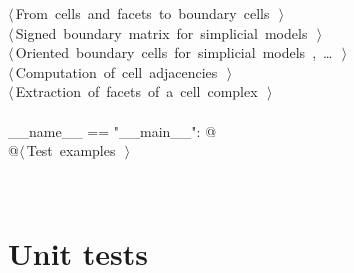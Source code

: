 \documentclass[11pt,oneside]{article}	%
\begin{document}
\begin{flushleft}
\begin{minipage}{\linewidth}
\begin{list}{}{}
\mbox{}\verb@@\hbox{$\langle\,$From cells and facets to boundary cells\nobreak\ {\footnotesize {}}$\,\rangle$}\verb@@\\
\mbox{}\verb@@\hbox{$\langle\,$Signed boundary matrix for simplicial models\nobreak\ {\footnotesize {}}$\,\rangle$}\verb@@\\
\mbox{}\verb@@\hbox{$\langle\,$Oriented boundary cells for simplicial models\nobreak\ {\footnotesize {}, \ldots\ }$\,\rangle$}\verb@@\\
\mbox{}\verb@@\hbox{$\langle\,$Computation of cell adjacencies\nobreak\ {\footnotesize {}}$\,\rangle$}\verb@@\\
\mbox{}\verb@@\hbox{$\langle\,$Extraction of facets of a cell complex\nobreak\ {\footnotesize {}}$\,\rangle$}\verb@@\\
\mbox{}\verb@@\\
\mbox{}\verb@if __name__ == "__main__": @\\
\mbox{}\verb@   @\hbox{$\langle\,$Test examples\nobreak\ {\footnotesize {}}$\,\rangle$}\verb@@\\
\mbox{}\verb@@{\NWsep}
\end{list}
\vspace{-2ex}
\end{minipage}\\[4ex]
\end{flushleft}

\section{Unit tests}
\end{document}
